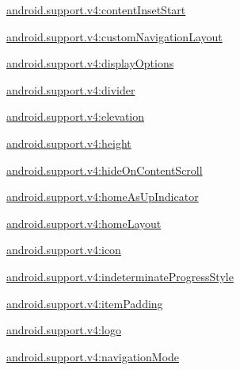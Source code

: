 {\ttfamily \hyperlink{classandroid_1_1support_1_1v4_1_1R_1_1styleable_a8c36e247399bd81da6f4808194dd4df8}{android.\+support.\+v4\+:content\+Inset\+Start}}

{\ttfamily \hyperlink{classandroid_1_1support_1_1v4_1_1R_1_1styleable_a1ea53c5c11ad0d5f6a9a592da14f2b64}{android.\+support.\+v4\+:custom\+Navigation\+Layout}}

{\ttfamily \hyperlink{classandroid_1_1support_1_1v4_1_1R_1_1styleable_a777891bdb003968579bc757b1781ca24}{android.\+support.\+v4\+:display\+Options}}

{\ttfamily \hyperlink{classandroid_1_1support_1_1v4_1_1R_1_1styleable_ac3707487601420af47218613124bf864}{android.\+support.\+v4\+:divider}}

{\ttfamily \hyperlink{classandroid_1_1support_1_1v4_1_1R_1_1styleable_af9188f37272bce5af588009089023764}{android.\+support.\+v4\+:elevation}}

{\ttfamily \hyperlink{classandroid_1_1support_1_1v4_1_1R_1_1styleable_a96d9c1a905653113d5071864c6cabc6f}{android.\+support.\+v4\+:height}}

{\ttfamily \hyperlink{classandroid_1_1support_1_1v4_1_1R_1_1styleable_a34d5eac32f5d297f42d6d9d3a885891b}{android.\+support.\+v4\+:hide\+On\+Content\+Scroll}}

{\ttfamily \hyperlink{classandroid_1_1support_1_1v4_1_1R_1_1styleable_afcf7f4cdfdc06edf00b3dde2479d7702}{android.\+support.\+v4\+:home\+As\+Up\+Indicator}}

{\ttfamily \hyperlink{classandroid_1_1support_1_1v4_1_1R_1_1styleable_abb8398bbec7921fb6596d6de854eb0cc}{android.\+support.\+v4\+:home\+Layout}}

{\ttfamily \hyperlink{classandroid_1_1support_1_1v4_1_1R_1_1styleable_aaa9149c39fa694d73adbfce1bf7a2147}{android.\+support.\+v4\+:icon}}

{\ttfamily \hyperlink{classandroid_1_1support_1_1v4_1_1R_1_1styleable_a044b37dfc919ff9fb71d66587fe8f559}{android.\+support.\+v4\+:indeterminate\+Progress\+Style}}

{\ttfamily \hyperlink{classandroid_1_1support_1_1v4_1_1R_1_1styleable_a8548ce153987b04b5d4798301bc48594}{android.\+support.\+v4\+:item\+Padding}}

{\ttfamily \hyperlink{classandroid_1_1support_1_1v4_1_1R_1_1styleable_aaa9284e4203b58e1c1be7d41138d3b94}{android.\+support.\+v4\+:logo}}

{\ttfamily \hyperlink{classandroid_1_1support_1_1v4_1_1R_1_1styleable_a0f55fffd685c46c93b83a67738984c79}{android.\+support.\+v4\+:navigation\+Mode}}


